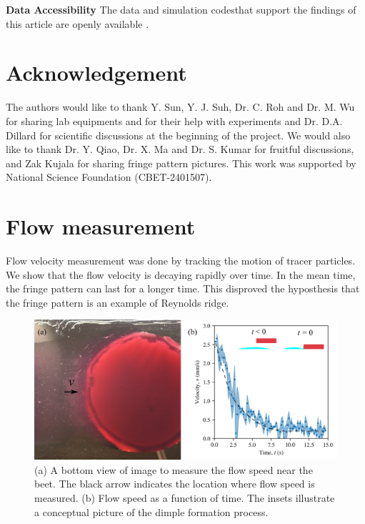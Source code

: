 \documentclass[aps,prfluids,amsmath,amssymb,superscriptaddress,longbibliography]{revtex4-2}
\begin{document}
\noindent\textbf{Data Accessibility}
The data and simulation codesthat support the findings of this article are openly available \cite{Data}.

\section{Acknowledgement}

The authors would like to thank Y. Sun, Y. J. Suh, Dr. C. Roh and Dr. M. Wu for sharing lab equipments and for their help with experiments and Dr. D.A. Dillard for scientific discussions at the beginning of the project. 
We would also like to thank Dr. Y. Qiao, Dr. X. Ma and Dr. S. Kumar for fruitful discussions, and Zak Kujala for sharing fringe pattern pictures. 
This work was supported by National Science Foundation (CBET-2401507).

\appendix

\renewcommand{\thefigure}{A\arabic{figure}} %
\renewcommand{\thetable}{A\Roman{table}} %
\setcounter{figure}{0} %
\setcounter{table}{0} %

\section{Flow measurement}\label{app:flow}

Flow velocity measurement was done by tracking the motion of tracer particles.
We show that the flow velocity is decaying rapidly over time. 
In the mean time, the fringe pattern can last for a longer time.
This disproved the hyposthesis that the fringe pattern is an example of Reynolds ridge.

\begin{figure}[ht]
    \centering
    \includegraphics[width=.7\linewidth]{beet_flow_measurement.png}
    \caption{
    (a) A bottom view of image to measure the flow speed near the beet. The black arrow indicates the location where flow speed is measured.
    (b) Flow speed as a function of time. The insets illustrate a conceptual picture of the dimple formation process.
    }
    \label{fig:flow-measurement}
\end{figure}
\end{document}
